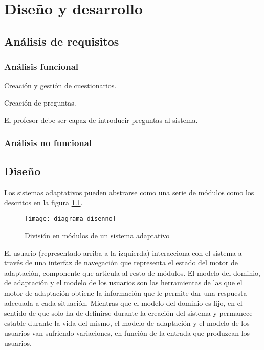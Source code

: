 \chapter{Diseño y desarrollo\label{sec:disenhoYDesarrollo}}



\section{Análisis de requisitos}

\subsection{Análisis funcional}

\begin{rf0}
	\item Creación y gestión de cuestionarios.
	\begin{rf0*}
		\item Creación de preguntas.
		\begin{rf0*}
			\item El profesor debe ser capaz de introducir preguntas al sistema.
		\end{rf0*}
	\end{rf0*}
\end{rf0}

\subsection{Análisis no funcional}



\section{Diseño}

Los sistemas adaptativos pueden abstrarse como una serie de módulos como los descritos en la figura \ref{fig:diagrama_disenno}. 

\begin{figure}[htp!]
	\centering
	\texttt{[image: diagrama\_disenno]}
	\caption{División en módulos de un sistema adaptativo}
	\label{fig:diagrama_disenno}
\end{figure}

El usuario (representado arriba a la izquierda) interacciona con el sistema a través de una interfaz de navegación que representa el estado del motor de adaptación, componente que articula al resto de módulos. El modelo del dominio, de adaptación y el modelo de los usuarios son las herramientas de las que el motor de adaptación obtiene la información que le permite dar una respuesta adecuada a cada situación. Mientras que el modelo del dominio es fijo, en el sentido de que solo ha de definirse durante la creación del sistema y permanece estable durante la vida del mismo, el modelo de adaptación y el modelo de los usuarios van sufriendo variaciones, en función de la entrada que produzcan los usuarios.

